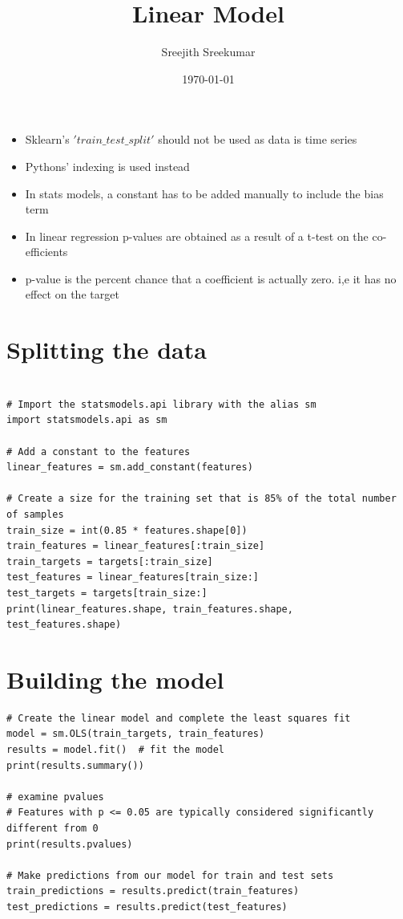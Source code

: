 \documentclass[11pt]{article}
\author{Sreejith Sreekumar}
\date{\today}
\title{Linear Model}
\begin{document}
\maketitle
\tableofcontents

\begin{itemize}
\item Sklearn's \('train\_test\_split'\) should not be used as data is time series
\item Pythons' indexing is used instead
\item In stats models, a constant has to be added manually to include the bias term
\item In linear regression p-values are obtained as a result of a t-test on the co-efficients
\item p-value is the percent chance that a coefficient is actually zero. i,e it has no effect on the target
\end{itemize}


\section{Splitting the data}
\label{sec:orgb8b479d}

\begin{verbatim}

# Import the statsmodels.api library with the alias sm
import statsmodels.api as sm

# Add a constant to the features
linear_features = sm.add_constant(features)

# Create a size for the training set that is 85% of the total number of samples
train_size = int(0.85 * features.shape[0])
train_features = linear_features[:train_size]
train_targets = targets[:train_size]
test_features = linear_features[train_size:]
test_targets = targets[train_size:]
print(linear_features.shape, train_features.shape, test_features.shape)

\end{verbatim}


\section{Building the model}
\label{sec:orgf6cf335}

\begin{verbatim}
# Create the linear model and complete the least squares fit
model = sm.OLS(train_targets, train_features)
results = model.fit()  # fit the model
print(results.summary())

# examine pvalues
# Features with p <= 0.05 are typically considered significantly different from 0
print(results.pvalues)

# Make predictions from our model for train and test sets
train_predictions = results.predict(train_features)
test_predictions = results.predict(test_features)
\end{verbatim}
\end{document}
